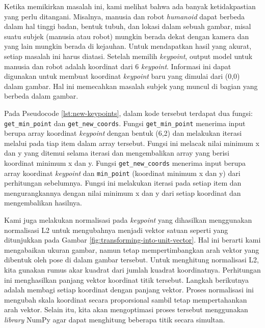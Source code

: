 Ketika memikirkan masalah ini, kami melihat bahwa ada banyak ketidakpastian yang perlu ditangani. Misalnya, manusia dan robot \textit{humanoid} dapat berbeda dalam hal tinggi badan, bentuk tubuh, dan lokasi dalam sebuah gambar, misal suatu subjek (manusia atau robot) mungkin berada dekat dengan kamera dan yang lain mungkin berada di kejauhan.
Untuk mendapatkan hasil yang akurat, setiap masalah ini harus diatasi.
Setelah memilih \textit{keypoint}, output model untuk manusia dan robot adalah koordinat dari 6 \textit{keypoint}. Informasi ini dapat digunakan untuk membuat koordinat \textit{keypoint} baru yang dimulai dari (0,0) dalam gambar. Hal ini memecahkan masalah subjek yang muncul di bagian yang berbeda dalam gambar.


Pada Pseudocode \ref{lst:new-keypoints}, dalam kode tersebut terdapat dua fungsi: \verb|get_min_point| dan \verb|get_new_coords|. Fungsi \verb|get_min_point| menerima input berupa array koordinat \textit{keypoint} dengan bentuk (6,2) dan melakukan iterasi melalui pada tiap item dalam array tersebut.
Fungsi ini melacak nilai minimum x dan y yang ditemui selama iterasi dan mengembalikan array yang berisi koordinat minimum x dan y.
Fungsi \verb|get_new_coords| menerima input berupa array koordinat \textit{keypoint} dan \verb|min_point| (koordinat minimum x dan y) dari perhitungan sebelumnya. Fungsi ini melakukan iterasi pada setiap item dan mengurangkannya dengan nilai minimum x dan y dari setiap koordinat dan mengembalikan hasilnya.

Kami juga melakukan normalisasi pada \textit{keypoint} yang dihasilkan menggunakan normalisasi L2 untuk mengubahnya menjadi vektor satuan seperti yang ditunjukkan pada Gambar \ref{fig:transforming-into-unit-vector}. Hal ini berarti kami mengabaikan ukuran gambar, namun tetap mempertimbangkan arah vektor yang dibentuk oleh pose di dalam gambar tersebut.
Untuk menghitung normalisasi L2, kita gunakan rumus akar kuadrat dari jumlah kuadrat koordinatnya. Perhitungan ini menghasilkan panjang vektor koordinat titik tersebut.
Langkah berikutnya adalah membagi setiap koordinat dengan panjang vektor. Proses normalisasi ini mengubah skala koordinat secara proporsional sambil tetap mempertahankan arah vektor. Selain itu, kita akan mengoptimasi proses tersebut menggunakan \textit{library} NumPy agar dapat menghitung beberapa titik secara simultan.


